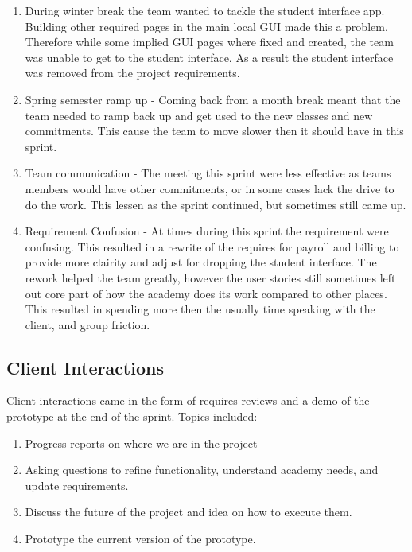 \begin{enumerate}
\item During winter break the team wanted to tackle the student interface app. Building other required pages in the main local GUI made this a problem. Therefore while some implied GUI pages where fixed and created, the team was unable to get to the student interface. As a result the student interface was removed from the project requirements.
\item Spring semester ramp up - Coming back from a month break meant that the team needed to ramp back up and get used to the new classes and new commitments. This cause the team to move slower then it should have in this sprint. 
\item Team communication - The meeting this sprint were less effective as teams members would have other commitments, or in some cases lack the drive to do the work. This lessen as the sprint continued, but sometimes still came up.
\item Requirement Confusion - At times during this sprint the requirement were confusing. This resulted in a rewrite of the requires for payroll and billing to provide more clairity and adjust for dropping the student interface. The rework helped the team greatly, however the user stories still sometimes left out core part of how the academy does its work compared to other places. This resulted in spending more then the usually time speaking with the client, and group friction.
\end{enumerate}

\subsection{Client Interactions}

Client interactions came in the form of requires reviews and a demo of the prototype at the end of the sprint. Topics included:

\begin{enumerate}
\item Progress reports on where we are in the project
\item Asking questions to refine functionality, understand academy needs, and update requirements.
\item Discuss the future of the project and idea on how to execute them.
\item Prototype the current version of the prototype.
\end{enumerate}


